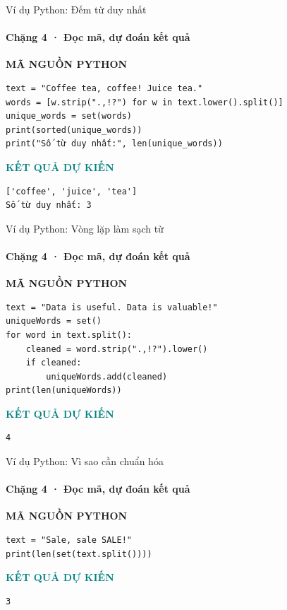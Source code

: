 \documentclass[aspectratio=169,10pt]{beamer}
\begin{document}
\begin{frame}[fragile,t]{Ví dụ Python: Đếm từ duy nhất}
\framesubtitle{Chặng 4 · Đọc mã, dự đoán kết quả}
\vspace{-1mm}
{\small\color{muted}\textbf{MÃ NGUỒN PYTHON}}\par\vspace{1mm}
\begin{Verbatim}[fontsize=\scriptsize,frame=single,framesep=4mm,rulecolor=\color{teal!35},breaklines=true]
text = "Coffee tea, coffee! Juice tea."
words = [w.strip(".,!?") for w in text.lower().split()]
unique_words = set(words)
print(sorted(unique_words))
print("Số từ duy nhất:", len(unique_words))
\end{Verbatim}
\vspace{1mm}\textcolor{teal}{\scriptsize\textbf{KẾT QUẢ DỰ KIẾN}}
\begin{Verbatim}[fontsize=\scriptsize,breaklines=true]
['coffee', 'juice', 'tea']
Số từ duy nhất: 3
\end{Verbatim}

\end{frame}

\begin{frame}[fragile,t]{Ví dụ Python: Vòng lặp làm sạch từ}
\framesubtitle{Chặng 4 · Đọc mã, dự đoán kết quả}
\vspace{-1mm}
{\small\color{muted}\textbf{MÃ NGUỒN PYTHON}}\par\vspace{1mm}
\begin{Verbatim}[fontsize=\scriptsize,frame=single,framesep=4mm,rulecolor=\color{teal!35},breaklines=true]
text = "Data is useful. Data is valuable!"
uniqueWords = set()
for word in text.split():
    cleaned = word.strip(".,!?").lower()
    if cleaned:
        uniqueWords.add(cleaned)
print(len(uniqueWords))
\end{Verbatim}
\vspace{1mm}\textcolor{teal}{\scriptsize\textbf{KẾT QUẢ DỰ KIẾN}}
\begin{Verbatim}[fontsize=\scriptsize,breaklines=true]
4
\end{Verbatim}

\end{frame}

\begin{frame}[fragile,t]{Ví dụ Python: Vì sao cần chuẩn hóa}
\framesubtitle{Chặng 4 · Đọc mã, dự đoán kết quả}
\vspace{-1mm}
{\small\color{muted}\textbf{MÃ NGUỒN PYTHON}}\par\vspace{1mm}
\begin{Verbatim}[fontsize=\scriptsize,frame=single,framesep=4mm,rulecolor=\color{teal!35},breaklines=true]
text = "Sale, sale SALE!"
print(len(set(text.split())))
\end{Verbatim}
\vspace{1mm}\textcolor{teal}{\scriptsize\textbf{KẾT QUẢ DỰ KIẾN}}
\begin{Verbatim}[fontsize=\scriptsize,breaklines=true]
3
\end{Verbatim}

\end{frame}
\end{document}
